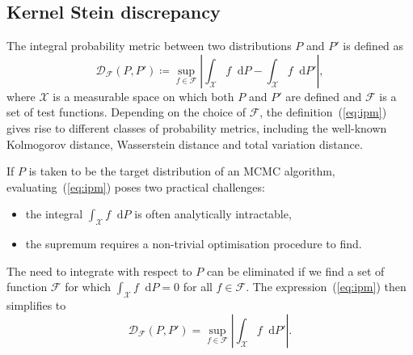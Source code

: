 \documentclass[11pt,a4paper]{report}
\newcommand*\diff{\mathop{}\!\mathrm{d}}
\begin{document}
\subsection{Kernel Stein discrepancy}

The integral probability metric between two distributions $P$ and $P'$ is defined as
\begin{equation}
\mathcal{D}_{\mathcal{F}}(P, P') \coloneq \sup_{f \in \mathcal{F}}\left|\int_\mathcal{X} f \diff P - \int_\mathcal{X} f \diff P' \right|,
\label{eq:ipm}
\end{equation}
where $\mathcal{X}$ is a measurable space on which both $P$ and $P'$ are defined and $\mathcal{F}$ is a set of test functions. Depending on the choice of $\mathcal{F}$, the definition~(\ref{eq:ipm}) gives rise to different classes of probability metrics, including the well-known Kolmogorov distance, Wasserstein distance and total variation distance.

If $P$ is taken to be the target distribution of an MCMC algorithm, evaluating~(\ref{eq:ipm}) poses two practical challenges:
\begin{itemize}
\item the integral $\int_\mathcal{X} f \diff P$ is often analytically intractable,
\item the supremum requires a non-trivial optimisation procedure to find.
\end{itemize}

The need to integrate with respect to $P$ can be eliminated if we find a set of function $\mathcal{F}$ for which $\int_\mathcal{X} f \diff P = 0$ for all $f \in \mathcal{F}$. The expression~(\ref{eq:ipm}) then simplifies to
\begin{equation}
\mathcal{D}_{\mathcal{F}}(P, P') = \sup_{f \in \mathcal{F}}\left|\int_\mathcal{X} f \diff P' \right|.
\label{eq:stein-discrepancy-sup}
\end{equation}
\end{document}
